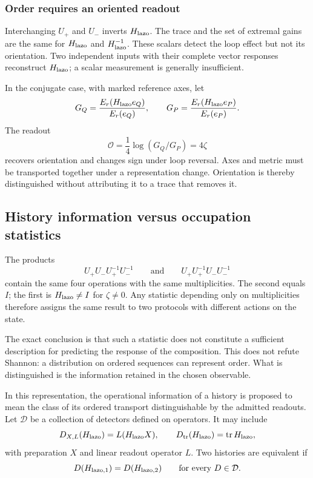 \subsubsection{Order requires an oriented readout}
\label{md:comp:orden-orientado}

Interchanging \(U_+\) and \(U_-\) inverts \(H_{\rm lazo}\).
The trace and the set of extremal gains are the same for
\(H_{\rm lazo}\) and \(H_{\rm lazo}^{-1}\). These scalars detect the
loop effect but not its orientation. Two independent inputs with their
complete vector responses reconstruct \(H_{\rm lazo}\); a scalar
measurement is generally insufficient.

In the conjugate case, with marked reference axes, let
\[
 G_Q=\frac{E_r(H_{\rm lazo}e_Q)}{E_r(e_Q)},\qquad
 G_P=\frac{E_r(H_{\rm lazo}e_P)}{E_r(e_P)}.
\]
The readout
\begin{equation}
 \mathcal O=\frac14\log(G_Q/G_P)=4\zeta
 \label{md:comp:lector-orientado}
\end{equation}
recovers orientation and changes sign under loop reversal.
Axes and metric must be transported together under a representation
change. Orientation is thereby distinguished without attributing it
to a trace that removes it.

\subsection{History information versus occupation statistics}
\label{md:comp:informacion}

The products
\[
 U_+U_-U_+^{-1}U_-^{-1}
 \qquad\text{and}\qquad
 U_+U_+^{-1}U_-U_-^{-1}
\]
contain the same four operations with the same multiplicities.
The second equals \(I\); the first is \(H_{\rm lazo}\ne I\) for
\(\zeta\ne0\). Any statistic depending only on multiplicities
therefore assigns the same result to two protocols with different
actions on the state.

The exact conclusion is that such a statistic does not constitute
a sufficient description for predicting the response of the composition.
This does not refute Shannon: a distribution on ordered sequences can
represent order. What is distinguished is the information retained
in the chosen observable.

\begin{definition}
\label{md:comp:def-informacion}
In this representation, the operational information of a history is
proposed to mean the class of its ordered transport distinguishable
by the admitted readouts. Let \(\mathcal D\) be a collection of
detectors defined on operators. It may include
\[
 D_{X,L}(H_{\rm lazo})=L(H_{\rm lazo}X),
 \qquad D_{\rm tr}(H_{\rm lazo})=\operatorname{tr}H_{\rm lazo},
\]
with preparation \(X\) and linear readout operator \(L\).
Two histories are equivalent if
\[
 D(H_{{\rm lazo},1})=D(H_{{\rm lazo},2})
 \qquad\text{for every }D\in\mathcal D.
\]
\end{definition}

